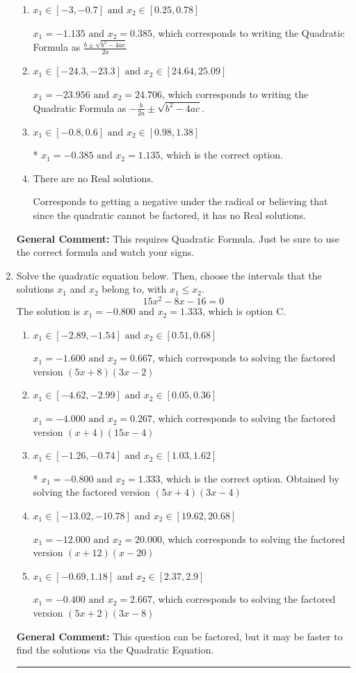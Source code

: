 \documentclass{extbook}[14pt]
\newcommand{\litem}[1]{\item #1

\rule{\textwidth}{0.4pt}}
\begin{document}
\begin{enumerate}
{\begin{enumerate}[label=\Alph*.]
 $x_1 = -6.166 \text{ and } x_2 = 18.166$, which corresponds to using the Quadratic Formula with $a=1$
\item \( x_1 \in [-3, -0.7] \text{ and } x_2 \in [0.25, 0.78] \)

 $x_1 = -1.135 \text{ and } x_2 = 0.385$, which corresponds to writing the Quadratic Formula as $\frac{b \pm \sqrt{b^2 - 4ac}}{2a}$
\item \( x_1 \in [-24.3, -23.3] \text{ and } x_2 \in [24.64, 25.09] \)

 $x_1 = -23.956 \text{ and } x_2 = 24.706$, which corresponds to writing the Quadratic Formula as $-\frac{b}{2a} \pm \sqrt{b^2 - 4ac}$.
\item \( x_1 \in [-0.8, 0.6] \text{ and } x_2 \in [0.98, 1.38] \)

* $x_1 = -0.385 \text{ and } x_2 = 1.135$, which is the correct option.
\item \( \text{There are no Real solutions.} \)

Corresponds to getting a negative under the radical or believing that since the quadratic cannot be factored, it has no Real solutions.
\end{enumerate}

\textbf{General Comment:} This requires Quadratic Formula. Just be sure to use the correct formula and watch your signs.
}
\litem{
Solve the quadratic equation below. Then, choose the intervals that the solutions $x_1$ and $x_2$ belong to, with $x_1 \leq x_2$.
\[ 15x^{2} -8 x -16 = 0 \]The solution is \( x_1 = -0.800 \text{ and } x_2 = 1.333 \), which is option C.\begin{enumerate}[label=\Alph*.]
\item \( x_1 \in [-2.89, -1.54] \text{ and } x_2 \in [0.51, 0.68] \)

$x_1 = -1.600 \text{ and } x_2 = 0.667$, which corresponds to solving the factored version $(5x + 8)(3x -2)$
\item \( x_1 \in [-4.62, -2.99] \text{ and } x_2 \in [0.05, 0.36] \)

$x_1 = -4.000 \text{ and } x_2 = 0.267$, which corresponds to solving the factored version $(x + 4)(15x -4)$
\item \( x_1 \in [-1.26, -0.74] \text{ and } x_2 \in [1.03, 1.62] \)

* $x_1 = -0.800 \text{ and } x_2 = 1.333$, which is the correct option. Obtained by solving the factored version $(5x + 4)(3x -4)$
\item \( x_1 \in [-13.02, -10.78] \text{ and } x_2 \in [19.62, 20.68] \)

$x_1 = -12.000 \text{ and } x_2 = 20.000$, which corresponds to solving the factored version $(x + 12)(x -20)$
\item \( x_1 \in [-0.69, 1.18] \text{ and } x_2 \in [2.37, 2.9] \)

$x_1 = -0.400 \text{ and } x_2 = 2.667$, which corresponds to solving the factored version $(5x + 2)(3x -8)$
\end{enumerate}

\textbf{General Comment:} This question can be factored, but it may be faster to find the solutions via the Quadratic Equation.
}
\end{enumerate}
\end{document}
